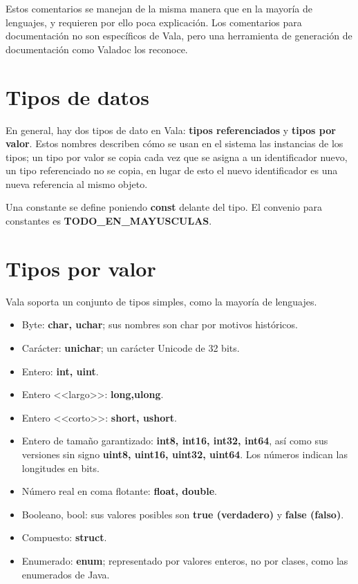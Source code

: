 \documentclass[12pt,twoside]{book}
\begin{document}
Estos comentarios se manejan de la misma manera que en la mayoría de lenguajes, y requieren por ello poca explicación. Los comentarios para documentación no son específicos de Vala, pero una herramienta de generación de documentación como Valadoc los reconoce.

\section{Tipos de datos}

En general, hay dos tipos de dato en Vala: \textbf{tipos referenciados} y \textbf{tipos por valor}. Estos nombres describen cómo se usan en el sistema las instancias de los tipos; un tipo por valor se copia cada vez que se asigna a un identificador nuevo, un tipo referenciado no se copia, en lugar de esto el nuevo identificador es una nueva referencia al mismo objeto.

Una constante se define poniendo \textbf{const} delante del tipo. El convenio para constantes es \textbf{TODO\_EN\_MAYUSCULAS}.

\section{Tipos por valor}

Vala soporta un conjunto de tipos simples, como la mayoría de lenguajes.

\begin{itemize}
	\item Byte: \textbf{ char, uchar}; sus nombres son char por motivos históricos.
	\item Carácter: \textbf{unichar}; un carácter Unicode de 32 bits.
	\item Entero: \textbf{int, uint}.
	\item Entero <<largo>>: \textbf{long,ulong}.
	\item Entero <<corto>>: \textbf{short, ushort}.
	\item Entero de tamaño garantizado: \textbf{int8, int16, int32, int64}, así como sus versiones sin signo \textbf{uint8, uint16, uint32, uint64}. Los números indican las longitudes en bits.
	\item Número real en coma flotante: \textbf{float, double}.
	\item Booleano, bool: sus valores posibles son \textbf{true (verdadero)} y \textbf{false (falso)}.
	\item Compuesto: \textbf{struct}.
	\item Enumerado: \textbf{enum}; representado por valores enteros, no por clases, como las enumerados de Java.
\end{itemize}
\end{document}
